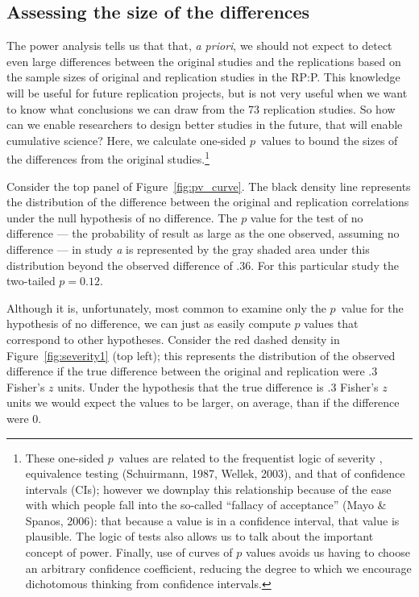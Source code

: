 \documentclass[doc,a4paper,floatsintext,draftfirst]{apa6}
\begin{document}
\subsection{Assessing the size of the differences}
The power analysis tells us that that, {\em a priori}, we should not expect to detect even large differences between the original studies and the replications based on the sample sizes of original and replication studies in the RP:P. This knowledge will be useful for future replication projects, but is not very useful when we want to know what conclusions we can draw from the 73 replication studies. So how can we enable researchers to design better studies in the future, that will enable cumulative science? Here, we calculate one-sided $p$~values to bound the sizes of the differences from the original studies.\footnote{These one-sided $p$~values are related to the frequentist logic of severity \citep{Mayo:Spanos:2006a}, equivalence testing (Schuirmann, 1987, Wellek, 2003), and that of confidence intervals (CIs); however we downplay this relationship because of the ease with which people fall into the so-called ``fallacy of acceptance'' (Mayo \& Spanos, 2006): that because a value is in a confidence interval, that value is plausible. The logic of tests also allows us to talk about the important concept of power. Finally, use of curves of $p$ values avoids us having to choose an arbitrary confidence coefficient, reducing the degree to which we encourage dichotomous thinking from confidence intervals.} 

\nocite{Wellek:2003,Schuirmann:1987}

Consider the top panel of Figure~\ref{fig:pv_curve}. The black density line represents the distribution of the difference between the original and replication correlations under the null hypothesis of no difference. The $p$ value for the test of no difference --- the probability of result as large as the one observed, assuming no difference --- in study {\em a} is represented by the gray shaded area under this distribution beyond the observed difference of .36. For this particular study the two-tailed $p=0.12$. 

Although it is, unfortunately, most common to examine only the $p$~value for the hypothesis of no difference, we can just as easily compute $p$ values that correspond to other hypotheses. Consider the red dashed density in Figure~\ref{fig:severity1} (top left); this represents the distribution of the observed difference if the true difference between the original and replication were .3 Fisher's $z$ units. Under the hypothesis that the true difference is .3 Fisher's $z$ units we would expect the values to be larger, on average, than if the difference were 0.
\end{document}
